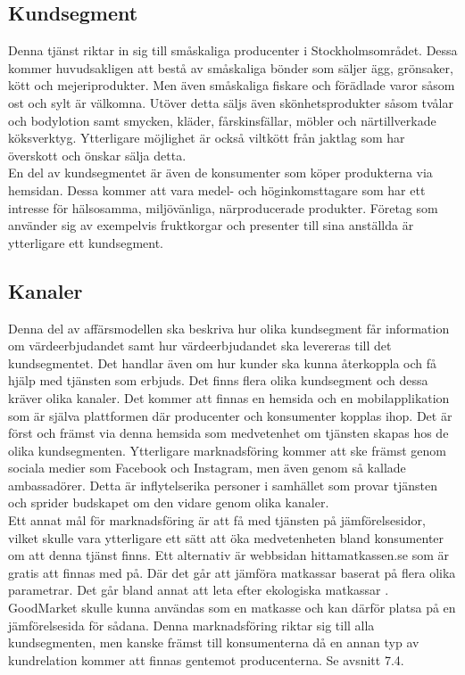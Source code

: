 \documentclass[10pt,a4paper,oneside]{article}
\begin{document}
\subsection{Kundsegment}
Denna tjänst riktar in sig till småskaliga producenter i Stockholmsområdet. Dessa kommer huvudsakligen att bestå av småskaliga bönder som säljer ägg, grönsaker, kött och mejeriprodukter. Men även småskaliga fiskare och förädlade varor såsom ost och sylt är välkomna. Utöver detta säljs även skönhetsprodukter såsom tvålar och bodylotion samt smycken, kläder, fårskinsfällar, möbler och närtillverkade köksverktyg. Ytterligare möjlighet är också viltkött från jaktlag som har överskott och önskar sälja detta. \\

En del av kundsegmentet är även de konsumenter som köper produkterna via hemsidan. Dessa kommer att vara medel- och höginkomsttagare som har ett intresse för hälsosamma, miljövänliga, närproducerade produkter. Företag som använder sig av exempelvis fruktkorgar och presenter till sina anställda är ytterligare ett kundsegment. 

\subsection{Kanaler}
Denna del av affärsmodellen ska beskriva hur olika kundsegment får information om värdeerbjudandet samt hur värdeerbjudandet ska levereras till det kundsegmentet. Det handlar även om hur kunder ska kunna återkoppla och få hjälp med tjänsten som erbjuds. Det finns flera olika kundsegment och dessa kräver olika kanaler. Det kommer att finnas en hemsida och en mobilapplikation som är själva plattformen där producenter och konsumenter kopplas ihop. Det är först och främst via denna hemsida som medvetenhet om tjänsten skapas hos de olika kundsegmenten. Ytterligare marknadsföring kommer att ske främst genom sociala medier som Facebook och Instagram, men även genom så kallade ambassadörer. Detta är inflytelserika personer i samhället som provar tjänsten och sprider budskapet om den vidare genom olika kanaler. \\

Ett annat mål för marknadsföring är att få med tjänsten på jämförelsesidor, vilket skulle vara ytterligare ett sätt att öka medvetenheten bland konsumenter om att denna tjänst finns. Ett alternativ är webbsidan hittamatkassen.se som är gratis att finnas med på. Där det går att jämföra matkassar baserat på flera olika parametrar. Det går bland annat att leta efter ekologiska matkassar \cite{Hittamatkassen}. GoodMarket skulle kunna användas som en matkasse och kan därför platsa på en jämförelsesida för sådana. Denna marknadsföring riktar sig till alla kundsegmenten, men kanske främst till konsumenterna då en annan typ av kundrelation kommer att finnas gentemot producenterna. Se avsnitt 7.4. \\
\end{document}
